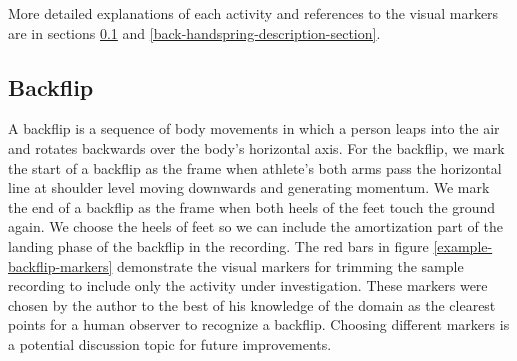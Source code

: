 More detailed explanations of each activity and references to the visual markers are in sections \ref{backflip-description-section} and \ref{back-handspring-description-section}.

\subsection{Backflip}
\label{backflip-description-section}

A backflip is a sequence of body movements in which a person leaps into the air and rotates backwards over the body's horizontal axis. For the backflip, we mark the start of a backflip as the frame when athlete's both arms pass the horizontal line at shoulder level moving downwards and generating momentum. We mark the end of a backflip as the frame when both heels of the feet touch the ground again. We choose the heels of feet so we can include the amortization part of the landing phase of the backflip in the recording. The red bars in figure \ref{example-backflip-markers} demonstrate the visual markers for trimming the sample recording to include only the activity under investigation. These markers were chosen by the author to the best of his knowledge of the domain as the clearest points for a human observer to recognize a backflip. Choosing different markers is a potential discussion topic for future improvements.

